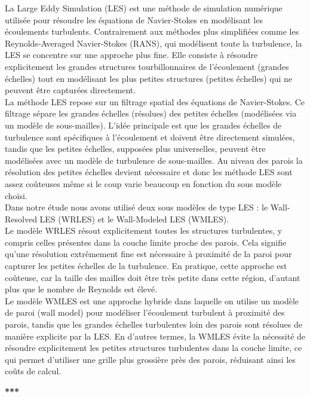 \documentclass[12pt]{article}
\theoremstyle{plain}
\theoremstyle{remark}
\begin{document}
La Large Eddy Simulation (LES) est une méthode de simulation numérique utilisée pour résoudre les équations de Navier-Stokes en modélisant les écoulements turbulents. Contrairement aux méthodes plus simplifiées comme les Reynolds-Averaged Navier-Stokes (RANS), qui modélisent toute la turbulence, la LES se concentre sur une approche plus fine. Elle consiste à résoudre explicitement les grandes structures tourbillonnaires de l’écoulement (grandes échelles) tout en modélisant les plus petites structures (petites échelles) qui ne peuvent être capturées directement. \\
La méthode LES repose sur un filtrage spatial des équations de Navier-Stokes. Ce filtrage sépare les grandes échelles (résolues) des petites échelles (modélisées via un modèle de sous-mailles). L’idée principale est que les grandes échelles de turbulence sont spécifiques à l’écoulement et doivent être directement simulées, tandis que les petites échelles, supposées plus universelles, peuvent être modélisées avec un modèle de turbulence de sous-mailles. Au niveau des parois la résolution des petites échelles devient nécessaire et donc les méthode LES sont assez coûteuses même si le coup varie beaucoup en fonction du sous modèle choisi. \\

Dans notre étude nous avons utilisé deux sous modèles de type LES : le Wall-Resolved LES (WRLES) et le Wall-Modeled LES (WMLES). \\
Le modèle WRLES résout explicitement toutes les structures turbulentes, y compris celles présentes dans la couche limite proche des parois. Cela signifie qu’une résolution extrêmement fine est nécessaire à proximité de la paroi pour capturer les petites échelles de la turbulence. En pratique, cette approche est coûteuse, car la taille des mailles doit être très petite dans cette région, d’autant plus que le nombre de Reynolds est élevé. \\
Le modèle WMLES est une approche hybride dans laquelle on utilise un modèle de paroi (wall model) pour modéliser l’écoulement turbulent à proximité des parois, tandis que les grandes échelles turbulentes loin des parois sont résolues de manière explicite par la LES. En d'autres termes, la WMLES évite la nécessité de résoudre explicitement les petites structures turbulentes dans la couche limite, ce qui permet d'utiliser une grille plus grossière près des parois, réduisant ainsi les coûts de calcul.

\begin{center}
	\large \bf{***}
\end{center}
\end{document}
